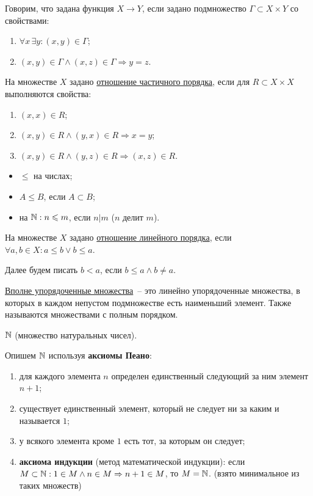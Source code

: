 Говорим, что задана функция $X \to Y$, если задано подмножество $\Gamma \subset X \times Y$ со свойствами:
\begin{enumerate}
	\item $\forall x\, \exists y: (x,y) \in \Gamma$;
	\item $(x,y) \in \Gamma \land (x,z) \in \Gamma \Rightarrow y=z$.
\end{enumerate}

\begin{defin}
	На множестве  $X$ задано \underline{отношение частичного порядка}, если для $R \subset X \times X$ выполняются свойства:
	\begin{enumerate}
		\item $(x,x) \in R$;
		\item $(x,y) \in R \land (y,x) \in R \Rightarrow x=y$;
		\item $(x,y) \in R \land (y,z) \in R \Rightarrow (x,z) \in R$.
	\end{enumerate}
\end{defin}
\begin{ex}
	\begin{itemize}
		\item $\le$ на числах;
		\item $A \le B$, если $A \subset B$;
		\item на $\mathbb{N}: n \leqslant m$, если $n|m$ ($n$ делит $m$).
	\end{itemize}
\end{ex}

\begin{defin}
	На множестве  $X$ задано \underline{отношение линейного порядка}, если $\forall a,b \in X: a \le b \lor b \le a$.
\end{defin}

Далее будем писать $b < a$, если $b \le a \land b \neq a$.

\begin{defin}
	\underline{Вполне упорядоченные множества}~-- это линейно упорядоченные множества, в которых в каждом непустом подмножестве есть наименьший элемент. Также называются множествами с полным порядком.
\end{defin}
\begin{ex}
	$\mathbb{N}$ (множество натуральных чисел).
\end{ex}

Опишем $\mathbb{N}$ используя \textbf{аксиомы Пеано}:
\begin{enumerate}
	\item для каждого элемента $n$ определен единственный следующий за ним элемент $n+1$;
	\item существует единственный элемент, который не следует ни за каким и называется $1$;
	\item у всякого элемента кроме $1$ есть тот, за которым он следует;
	\item \textbf{аксиома индукции} (метод математической индукции): если $M \subset \mathbb{N}: 1 \in M \land n \in M \Rightarrow n+1 \in M$, то $M=\mathbb{N}$. (взято минимальное из таких множеств)
\end{enumerate}

